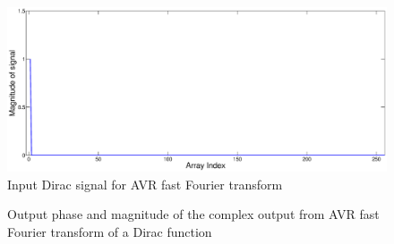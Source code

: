 \begin{figure}
\includegraphics[width=\textwidth]{./Figures/AVR_FFT_Dirac_Input.eps}
\caption{Input Dirac signal for AVR fast Fourier transform}
\label{fig:AVR:FFT:Dirac:Input}
\end{figure}
\begin{figure}
\caption{Output phase and magnitude of the complex output from AVR fast Fourier transform of a Dirac function}
\label{fig:AVR:FFT:Dirac:Output}
\end{figure}

